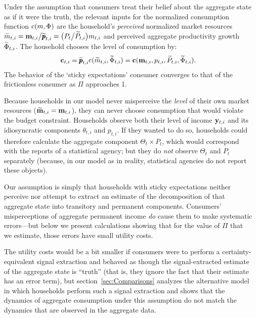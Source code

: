 \documentclass[titlepage]{./econtex}
\begin{document}
Under the assumption that consumers treat their belief about the aggregate state as if it were the truth, the relevant inputs for the normalized consumption function $\mathrm{c}(m,\Phi)$ are the household's \textit{perceived} normalized market resources $\widetilde{m}_{t,i} = \mathbf{m}_{t,i}\big/\widetilde{\pmb{p}}_{t,i} = \big(P_t\big/\widetilde{P}_{t,i}\big)m_{t,i}$ and perceived aggregate productivity growth $\widetilde{\Phi}_{t,i}$.  The household chooses the level of consumption by:
\begin{equation*}
   \mathbf{c}_{t,i} = \widetilde{\pmb{p}}_{t,i} \mathrm{c}(\widetilde{m}_{t,i},\widetilde{\Phi}_{t,i}) = \textbf{c}(\mathbf{m}_{t,i}, p_{t,i}, \widetilde{P}_{t,i}, \widetilde{\Phi}_{t,i}). \label{eq:cPerc}
\end{equation*}
 The behavior of the `sticky expectations' consumer converges to that of the frictionless consumer as $\Pi$ approaches 1.

Because households in our model never misperceive the \textit{level} of their own market resources ($\widetilde{\mathbf{m}}_{t,i}=\mathbf{m}_{t,i}$), they can never choose consumption that would violate the budget constraint.  Households observe both their level of income $\mathbf{y}_{t,i}$ and its idiosyncratic components $\theta_{t,i}$ and ${p}_{t,i}$. If they wanted to do so, households could therefore calculate the aggregate component $\Theta_{t}\times {P}_{t}$, which would correspond with the reports of a statistical agency; but they do \textit{not} observe $\Theta_{t}$ and ${P}_{t}$ separately (because, in our model as in reality, statistical agencies do not report these objects).

Our assumption is simply that households with sticky expectations neither perceive nor attempt to extract an estimate of the decomposition of that aggregate state into transitory and permanent components.  Consumers' misperceptions of aggregate permanent income \textit{do} cause them to make systematic errors---but below we present calculations showing that for the value of $\Pi$ that we estimate, those errors have small utility costs.

The utility costs would be a bit smaller if consumers were to perform a certainty-equivalent signal extraction and behaved as though the signal-extracted estimate of the aggregate state is ``truth'' (that is, they ignore the fact that their estimate has an error term), but section~\ref{sec:Comparisons} analyzes the alternative model in which households perform such a signal extraction and shows that the dynamics of aggregate consumption under this assumption do not match the dynamics that are observed in the aggregate data.
\end{document}
